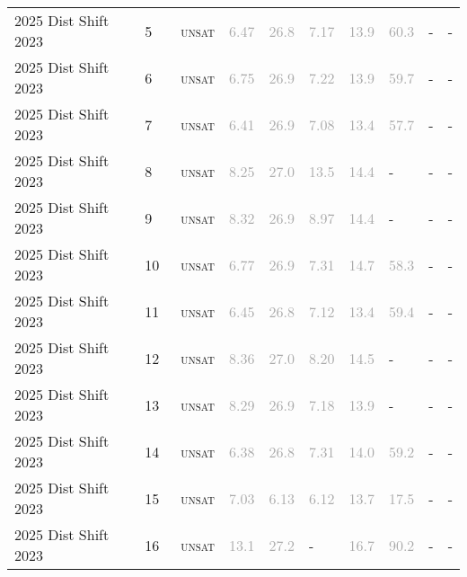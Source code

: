 \begin{center}
{\begin{longtable}{@{}llllllllll@{}}
2025 Dist Shift 2023 & 5 & ~\textsc{unsat} & \textcolor{darkgray}{6.47} & \textcolor{darkgray}{26.8} & \textcolor{darkgray}{7.17} & \textcolor{darkgray}{13.9} & \textcolor{darkgray}{60.3} & - & - \\
2025 Dist Shift 2023 & 6 & ~\textsc{unsat} & \textcolor{darkgray}{6.75} & \textcolor{darkgray}{26.9} & \textcolor{darkgray}{7.22} & \textcolor{darkgray}{13.9} & \textcolor{darkgray}{59.7} & - & - \\
2025 Dist Shift 2023 & 7 & ~\textsc{unsat} & \textcolor{darkgray}{6.41} & \textcolor{darkgray}{26.9} & \textcolor{darkgray}{7.08} & \textcolor{darkgray}{13.4} & \textcolor{darkgray}{57.7} & - & - \\
2025 Dist Shift 2023 & 8 & ~\textsc{unsat} & \textcolor{darkgray}{8.25} & \textcolor{darkgray}{27.0} & \textcolor{darkgray}{13.5} & \textcolor{darkgray}{14.4} & - & - & - \\
2025 Dist Shift 2023 & 9 & ~\textsc{unsat} & \textcolor{darkgray}{8.32} & \textcolor{darkgray}{26.9} & \textcolor{darkgray}{8.97} & \textcolor{darkgray}{14.4} & - & - & - \\
2025 Dist Shift 2023 & 10 & ~\textsc{unsat} & \textcolor{darkgray}{6.77} & \textcolor{darkgray}{26.9} & \textcolor{darkgray}{7.31} & \textcolor{darkgray}{14.7} & \textcolor{darkgray}{58.3} & - & - \\
2025 Dist Shift 2023 & 11 & ~\textsc{unsat} & \textcolor{darkgray}{6.45} & \textcolor{darkgray}{26.8} & \textcolor{darkgray}{7.12} & \textcolor{darkgray}{13.4} & \textcolor{darkgray}{59.4} & - & - \\
2025 Dist Shift 2023 & 12 & ~\textsc{unsat} & \textcolor{darkgray}{8.36} & \textcolor{darkgray}{27.0} & \textcolor{darkgray}{8.20} & \textcolor{darkgray}{14.5} & - & - & - \\
2025 Dist Shift 2023 & 13 & ~\textsc{unsat} & \textcolor{darkgray}{8.29} & \textcolor{darkgray}{26.9} & \textcolor{darkgray}{7.18} & \textcolor{darkgray}{13.9} & - & - & - \\
2025 Dist Shift 2023 & 14 & ~\textsc{unsat} & \textcolor{darkgray}{6.38} & \textcolor{darkgray}{26.8} & \textcolor{darkgray}{7.31} & \textcolor{darkgray}{14.0} & \textcolor{darkgray}{59.2} & - & - \\
2025 Dist Shift 2023 & 15 & ~\textsc{unsat} & \textcolor{darkgray}{7.03} & \textcolor{darkgray}{6.13} & \textcolor{darkgray}{6.12} & \textcolor{darkgray}{13.7} & \textcolor{darkgray}{17.5} & - & - \\
2025 Dist Shift 2023 & 16 & ~\textsc{unsat} & \textcolor{darkgray}{13.1} & \textcolor{darkgray}{27.2} & - & \textcolor{darkgray}{16.7} & \textcolor{darkgray}{90.2} & - & - \\

\end{longtable}}
\end{center}
